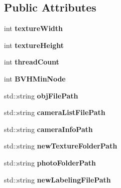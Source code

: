 \subsection*{Public Attributes}
\begin{DoxyCompactItemize}
\item 
\hypertarget{struct_arguments_a53b1eb430f4ea67ffd9a85696a295cd0}{}int {\bfseries texture\+Width}\label{struct_arguments_a53b1eb430f4ea67ffd9a85696a295cd0}

\item 
\hypertarget{struct_arguments_acba64f044d4603abac85ba2cf1b50b75}{}int {\bfseries texture\+Height}\label{struct_arguments_acba64f044d4603abac85ba2cf1b50b75}

\item 
\hypertarget{struct_arguments_a81212a8036b56467011fb90c075ec4d8}{}int {\bfseries thread\+Count}\label{struct_arguments_a81212a8036b56467011fb90c075ec4d8}

\item 
\hypertarget{struct_arguments_a90c008ddccf9fc27fc1e7db34b51b36e}{}int {\bfseries B\+V\+H\+Min\+Node}\label{struct_arguments_a90c008ddccf9fc27fc1e7db34b51b36e}

\item 
\hypertarget{struct_arguments_a5615cc24abc162c63ef3aedc135b0db4}{}std\+::string {\bfseries obj\+File\+Path}\label{struct_arguments_a5615cc24abc162c63ef3aedc135b0db4}

\item 
\hypertarget{struct_arguments_a033abba738ba0403e87f883cc203d618}{}std\+::string {\bfseries camera\+List\+File\+Path}\label{struct_arguments_a033abba738ba0403e87f883cc203d618}

\item 
\hypertarget{struct_arguments_a1efe0a7268bb4ab28a51566a13c5f36b}{}std\+::string {\bfseries camera\+Info\+Path}\label{struct_arguments_a1efe0a7268bb4ab28a51566a13c5f36b}

\item 
\hypertarget{struct_arguments_aacc8cf735f8d2793e4fbd81d05f22918}{}std\+::string {\bfseries new\+Texture\+Folder\+Path}\label{struct_arguments_aacc8cf735f8d2793e4fbd81d05f22918}

\item 
\hypertarget{struct_arguments_a784aabe9dd9bbeb828d1ad845b72887c}{}std\+::string {\bfseries photo\+Folder\+Path}\label{struct_arguments_a784aabe9dd9bbeb828d1ad845b72887c}

\item 
\hypertarget{struct_arguments_a4a043101d13a6c0540f501af85a691ce}{}std\+::string {\bfseries new\+Labeling\+File\+Path}\label{struct_arguments_a4a043101d13a6c0540f501af85a691ce}


\end{DoxyCompactItemize}
